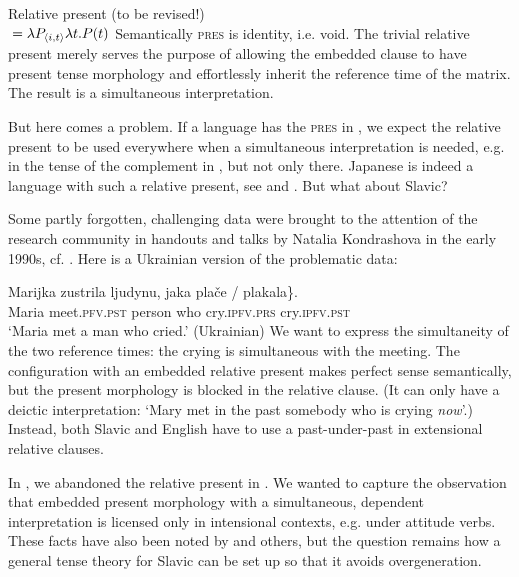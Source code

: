 \documentclass[output=paper,colorlinks,citecolor=brown]{langscibook}
\begin{document}
\ea\label{grs:55}	Relative present (to be revised!) \\
	${}= \lambda P_{\langle{i,t}\rangle}  \lambda t. P(t)$ 
\z
Semantically \textsc{pres} is identity, i.e. void.  
 The trivial relative present merely serves the purpose   of allowing the embedded clause to have present tense morphology and effortlessly inherit the reference time of the matrix. The result is a simultaneous interpretation.

But here comes a problem. If a language has the \textsc{pres} in , we expect the relative present to be used everywhere when a simultaneous interpretation is needed, e.g. in the tense of the complement in , but not only there. Japanese is indeed  a language with such a relative present, see \citet{ogihara96} and \citet{kusumoto99}. But what about Slavic?

Some partly forgotten, challenging data were  brought to the attention of the research community in handouts and talks by Natalia Kondrashova in the early 1990s, cf. \citet{Kondrashova1999}. Here is a Ukrainian version of the problematic data:



\ea\label{rel-papa}\gll
Marijka zustrila ljudynu, jaka  \minsp{\{\#} plače / plakala\}.\\
Maria meet.\textsc{pfv}.\textsc{pst} person who {} cry.\textsc{ipfv}.\textsc{prs} {} cry.\textsc{ipfv}.\textsc{pst} \\ 
\glt
 ‘Maria met a man who cried.' \hfill (Ukrainian)
\z
We want to express the simultaneity of the two reference times: the crying is simultaneous with the meeting. The configuration with an embedded relative present makes perfect sense semantically, but the present morphology is  blocked in the relative clause. (It can only have a deictic interpretation: `Mary met in the past somebody who is crying \textit{now}'.) Instead, both Slavic and English have to use a past-under-past in extensional  relative clauses.

In \citet{gronn_stechow2012}, we abandoned the relative present  in .
We wanted to capture the observation that 
embedded present morphology with a simultaneous, dependent interpretation is licensed only in intensional contexts, e.g. under attitude verbs. 
These facts have also been noted  by \citet{schlenker99} and others, but the question remains how a general tense theory for Slavic can be set up so that it avoids overgeneration. 
\end{document}

